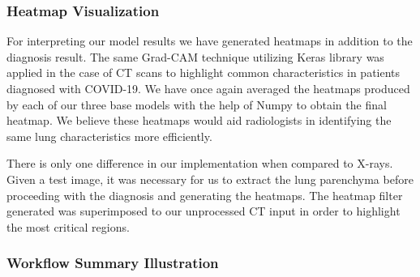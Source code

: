 \subsubsection{Heatmap Visualization}

For interpreting our model results we have generated heatmaps in addition to the diagnosis result. The same Grad-CAM technique utilizing Keras library \cite{KCV} was applied in the case of CT scans to highlight common characteristics in patients diagnosed with COVID-19. We have once again averaged the heatmaps produced by each of our three base models with the help of Numpy \cite{NUM} to obtain the final heatmap. We believe these heatmaps would aid radiologists in identifying the same lung characteristics more efficiently.

There is only one difference in our implementation when compared to X-rays. Given a test image, it was necessary for us to extract the lung parenchyma before proceeding with the diagnosis and generating the heatmaps. The heatmap filter generated was superimposed to our unprocessed CT input in order to highlight the most critical regions.

\subsubsection{Workflow Summary Illustration}

